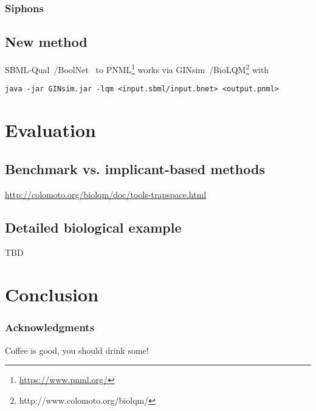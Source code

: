 \documentclass[runningheads]{llncs}
\begin{document}
\subsubsection{Siphons}

\subsection{New method}

SBML-Qual~\cite{chaouiya2013sbml}/BoolNet~\cite{mussel2010boolnet,klarner2017pyboolnet} to PNML\footnote{\url{https://www.pnml.org/}} works via GINsim~\cite{chaouiya2012logical}/BioLQM\footnote{http://www.colomoto.org/biolqm/} with
\begin{verbatim}
java -jar GINsim.jar -lqm <input.sbml/input.bnet> <output.pnml>
\end{verbatim}

\section{Evaluation}
\subsection{Benchmark vs. implicant-based methods}

\url{http://colomoto.org/biolqm/doc/tools-trapspace.html}

\subsection{Detailed biological example}

TBD

\section{Conclusion}

\subsubsection{Acknowledgments}
Coffee is good, you should drink some!



\end{document}
